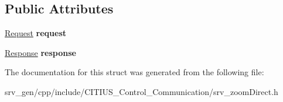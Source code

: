 \subsection*{\-Public \-Attributes}
\begin{DoxyCompactItemize}
\item 
\hypertarget{struct_c_i_t_i_u_s___control___communication_1_1srv__zoom_direct_ab64219123cdf3c842e0e3c6ac76aa9f3}{\hyperlink{struct_c_i_t_i_u_s___control___communication_1_1srv__zoom_direct_request__}{\-Request} {\bfseries request}}\label{struct_c_i_t_i_u_s___control___communication_1_1srv__zoom_direct_ab64219123cdf3c842e0e3c6ac76aa9f3}

\item 
\hypertarget{struct_c_i_t_i_u_s___control___communication_1_1srv__zoom_direct_a5f7d69ea26fda6024a6c6f4e5571b533}{\hyperlink{struct_c_i_t_i_u_s___control___communication_1_1srv__zoom_direct_response__}{\-Response} {\bfseries response}}\label{struct_c_i_t_i_u_s___control___communication_1_1srv__zoom_direct_a5f7d69ea26fda6024a6c6f4e5571b533}

\end{DoxyCompactItemize}


\-The documentation for this struct was generated from the following file\-:\begin{DoxyCompactItemize}
\item 
srv\-\_\-gen/cpp/include/\-C\-I\-T\-I\-U\-S\-\_\-\-Control\-\_\-\-Communication/srv\-\_\-zoom\-Direct.\-h\end{DoxyCompactItemize}
